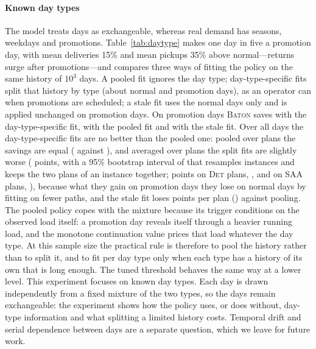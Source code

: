 \documentclass[preprint,authoryear,12pt]{elsarticle}
\theoremstyle{definition}
\theoremstyle{remark}
\begin{document}
\paragraph{Known day types} The model treats days as exchangeable,
whereas real demand has seasons, weekdays and promotions.
Table~\ref{tab:daytype} makes one day in five a promotion day, with mean
deliveries 15\% and mean pickups 35\% above normal---returns surge after
promotions---and compares three ways of fitting the policy on the same
history of $10^3$ days. A pooled fit ignores the day type; day-type-specific
fits split that history by type (about \dtNNormal{} normal and
\dtNPromo{} promotion days), as an operator can when promotions are
scheduled; a stale fit uses the normal days only and is applied unchanged
on promotion days. On promotion days \textsc{Baton} saves
\dtPromoAware{} with the day-type-specific fit, \dtPromoPooled{} with
the pooled fit and \dtPromoStale{} with the stale fit. Over all days the
day-type-specific fits are no better than the pooled one: pooled over
plans the savings are equal (\dtAllAware{} against \dtAllPooled), and
averaged over plans the split fits are slightly worse
(\dtAwarePooledDelta{} points, with a 95\% bootstrap interval of
\dtAwarePooledCI{} that resamples instances and keeps the two plans of an
instance together; \dtAwarePooledDetDelta{} points on \textsc{Det} plans,
\dtAwarePooledDetCI, and \dtAwarePooledSaaDelta{} on \textsc{SAA} plans,
\dtAwarePooledSaaCI), because what they gain
on promotion days they lose on normal days by fitting on fewer paths,
and the stale fit loses \dtStalePooledDelta{} points per plan
(\dtStalePooledCI) against pooling. The pooled policy copes with the mixture because its
trigger conditions on the observed load itself: a promotion day reveals
itself through a heavier running load, and the monotone continuation
value prices that load whatever the day type. At this sample size the
practical rule is therefore to pool the history rather than to split it,
and to fit per day type only when each type has a history of its own
that is long enough. The tuned threshold behaves the same way at a lower
level. This experiment focuses on known day types. Each day is drawn
independently from a fixed mixture of the two types, so the days remain
exchangeable: the experiment shows how the policy uses, or does without,
day-type information and what splitting a limited history costs.
Temporal drift and serial dependence between days are a separate
question, which we leave for future work.


\end{document}
